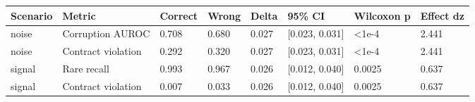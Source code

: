 \begin{tabular}{llllllll}
\toprule
Scenario & Metric & Correct & Wrong & Delta & 95\% CI & Wilcoxon p & Effect dz \\
\midrule
noise & Corruption AUROC & 0.708 & 0.680 & 0.027 & [0.023, 0.031] & <1e-4 & 2.441 \\
noise & Contract violation & 0.292 & 0.320 & 0.027 & [0.023, 0.031] & <1e-4 & 2.441 \\
signal & Rare recall & 0.993 & 0.967 & 0.026 & [0.012, 0.040] & 0.0025 & 0.637 \\
signal & Contract violation & 0.007 & 0.033 & 0.026 & [0.012, 0.040] & 0.0025 & 0.637 \\
\bottomrule
\end{tabular}
